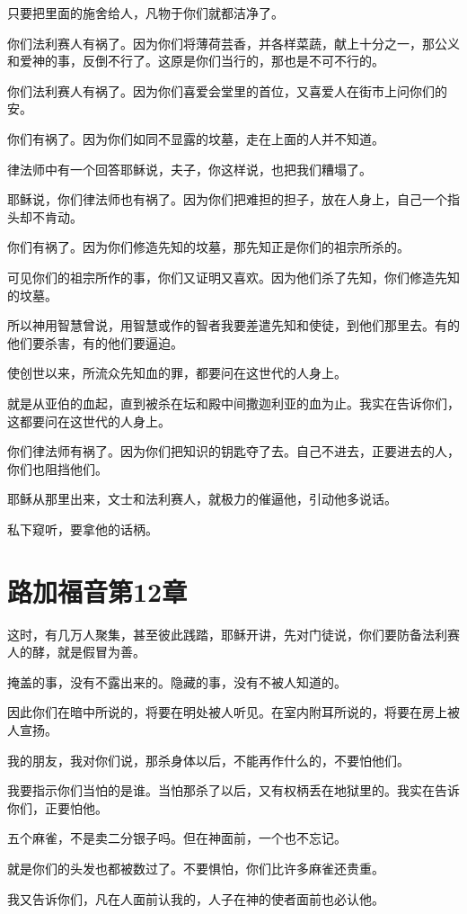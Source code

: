 \documentclass[12pt,oneside]{book}
\begin{document}
只要把里面的施舍给人，凡物于你们就都洁净了。

你们法利赛人有祸了。因为你们将薄荷芸香，并各样菜蔬，献上十分之一，那公义和爱神的事，反倒不行了。这原是你们当行的，那也是不可不行的。

你们法利赛人有祸了。因为你们喜爱会堂里的首位，又喜爱人在街市上问你们的安。

你们有祸了。因为你们如同不显露的坟墓，走在上面的人并不知道。

律法师中有一个回答耶稣说，夫子，你这样说，也把我们糟塌了。

耶稣说，你们律法师也有祸了。因为你们把难担的担子，放在人身上，自己一个指头却不肯动。

你们有祸了。因为你们修造先知的坟墓，那先知正是你们的祖宗所杀的。

可见你们的祖宗所作的事，你们又证明又喜欢。因为他们杀了先知，你们修造先知的坟墓。

所以神用智慧曾说，用智慧或作的智者我要差遣先知和使徒，到他们那里去。有的他们要杀害，有的他们要逼迫。

使创世以来，所流众先知血的罪，都要问在这世代的人身上。

就是从亚伯的血起，直到被杀在坛和殿中间撒迦利亚的血为止。我实在告诉你们，这都要问在这世代的人身上。

你们律法师有祸了。因为你们把知识的钥匙夺了去。自己不进去，正要进去的人，你们也阻挡他们。

耶稣从那里出来，文士和法利赛人，就极力的催逼他，引动他多说话。

私下窥听，要拿他的话柄。

\chapter{路加福音第12章}
这时，有几万人聚集，甚至彼此践踏，耶稣开讲，先对门徒说，你们要防备法利赛人的酵，就是假冒为善。

掩盖的事，没有不露出来的。隐藏的事，没有不被人知道的。

因此你们在暗中所说的，将要在明处被人听见。在室内附耳所说的，将要在房上被人宣扬。

我的朋友，我对你们说，那杀身体以后，不能再作什么的，不要怕他们。

我要指示你们当怕的是谁。当怕那杀了以后，又有权柄丢在地狱里的。我实在告诉你们，正要怕他。

五个麻雀，不是卖二分银子吗。但在神面前，一个也不忘记。

就是你们的头发也都被数过了。不要惧怕，你们比许多麻雀还贵重。

我又告诉你们，凡在人面前认我的，人子在神的使者面前也必认他。
\end{document}
